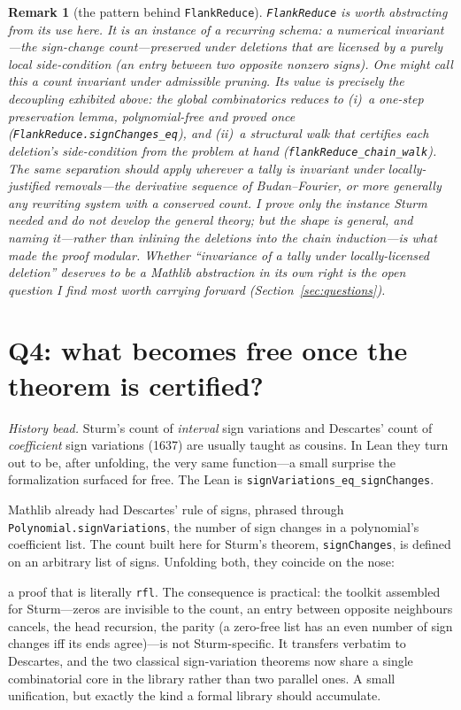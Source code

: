 \documentclass[11pt]{article}
\newtheorem{remark}{Remark}
\newcommand{\lean}[1]{\texttt{#1}}
\newcommand{\keyeq}[1]{\begin{center}\keybox{$\displaystyle #1$}\end{center}}
\begin{document}
\begin{remark}[the pattern behind \lean{FlankReduce}]\label{rem:pattern}
\lean{FlankReduce} is worth abstracting from its use here. It is an instance of a recurring schema:
a numerical invariant---the sign-change count---preserved under deletions that are licensed by a
purely \emph{local} side-condition (an entry between two opposite nonzero signs). One might call this
a \emph{count invariant under admissible pruning}. Its value is precisely the decoupling exhibited
above: the global combinatorics reduces to (i)~a one-step preservation lemma, polynomial-free and
proved once (\lean{FlankReduce.signChanges\_eq}), and (ii)~a structural walk that certifies each
deletion's side-condition from the problem at hand (\lean{flankReduce\_chain\_walk}). The same
separation should apply wherever a tally is invariant under locally-justified removals---the
derivative sequence of Budan--Fourier, or more generally any rewriting system with a conserved count.
I prove only the instance Sturm needed and do not develop the general theory; but the shape is
general, and naming it---rather than inlining the deletions into the chain induction---is what made
the proof modular. Whether ``invariance of a tally under locally-licensed deletion'' deserves to be
a Mathlib abstraction in its own right is the open question I find most worth carrying forward
(Section~\ref{sec:questions}).
\end{remark}

\section{Q4: what becomes free once the theorem is certified?}\label{sec:q4}

\emph{History bead.} Sturm's count of \emph{interval} sign variations and Descartes' count of
\emph{coefficient} sign variations (1637) are usually taught as cousins. In Lean they turn out to
be, after unfolding, the very same function---a small surprise the formalization surfaced for free.
The Lean is \lean{signVariations\_eq\_signChanges}.

Mathlib already had Descartes' rule of signs, phrased through \lean{Polynomial.signVariations}, the
number of sign changes in a polynomial's coefficient list. The count built here for Sturm's theorem,
\lean{signChanges}, is defined on an arbitrary list of signs. Unfolding both, they coincide on the
nose:
\keyeq{\lean{P.signVariations}\;=\;\lean{signChanges}\,(\lean{P.coeffList.map sign}),}
a proof that is literally \lean{rfl}. The consequence is practical: the toolkit assembled for
Sturm---zeros are invisible to the count, an entry between opposite neighbours cancels, the head
recursion, the parity (a zero-free list has an even number of sign changes iff its ends agree)---is
not Sturm-specific. It transfers verbatim to Descartes, and the two classical sign-variation
theorems now share a single combinatorial core in the library rather than two parallel ones. A
small unification, but exactly the kind a formal library should accumulate.
\end{document}
